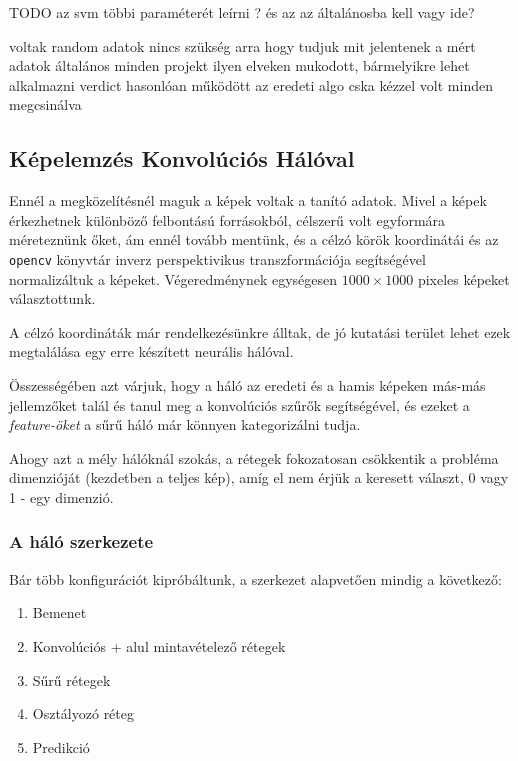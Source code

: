 TODO az svm többi paraméterét leírni
 ? és az az általánosba kell vagy ide? 



voltak random adatok
nincs szükség arra hogy tudjuk mit jelentenek a mért adatok
általános
minden projekt ilyen elveken mukodott, bármelyikre lehet alkalmazni
verdict
hasonlóan működött az eredeti algo cska kézzel volt minden megcsinálva



\subsection{Képelemzés Konvolúciós Hálóval}

Ennél a megközelítésnél maguk a képek voltak a tanító adatok.
Mivel a képek érkezhetnek különböző felbontású forrásokból, célszerű volt
egyformára méreteznünk őket, ám ennél tovább mentünk, és a célzó körök koordinátái 
és az \texttt{opencv} könyvtár inverz perspektivikus transzformációja segítségével 
normalizáltuk a képeket. Végeredménynek egységesen $ 1000 \times 1000 $ pixeles képeket
választottunk.

A célzó koordináták már rendelkezésünkre álltak, de jó kutatási terület lehet ezek 
megtalálása egy erre készített neurális hálóval.


Összességében azt várjuk, hogy a háló az eredeti és a hamis képeken más-más 
jellemzőket talál és tanul meg a konvolúciós szűrők segítségével, és ezeket
a \textit{feature-öket} a sűrű háló már könnyen kategorizálni tudja.

Ahogy azt a mély hálóknál szokás, a rétegek fokozatosan csökkentik a probléma
dimenzióját (kezdetben a teljes kép), amíg el nem érjük a keresett választ, 0 vagy 1 - 
egy dimenzió.

\subsubsection{A háló szerkezete}

Bár több konfigurációt kipróbáltunk, a szerkezet alapvetően mindig a következő:



\begin{enumerate} [itemsep=-1ex]
	\item Bemenet
	\item Konvolúciós + alul mintavételező rétegek
	\item Sűrű rétegek
	\item Osztályozó réteg
	\item Predikció
\end{enumerate}

